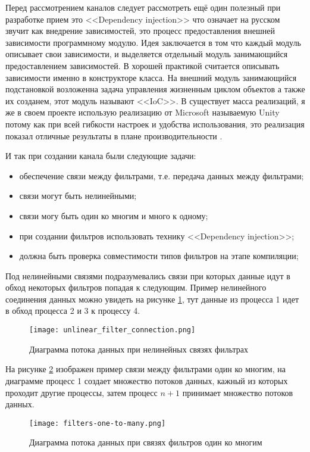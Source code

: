Перед рассмотрением каналов следует рассмотреть ещё один полезный при разработке прием это <<Dependency injection>> что означает на русском звучит как внедрение зависимостей, это процесс предоставления внешней зависимости программному модулю. Идея заключается в том что каждый модуль описывает свои зависимости, и выделяется отдельный модуль занимающийся предоставлением зависимостей. В \csharp{} хорошей практикой считается описывать зависимости именно в конструкторе класса. На внешний модуль занимающийся подстановкой возложенна задача управления жизненным циклом объектов а также их созданем, этот модуль называют <<IoC>>. В \dotnet{} существует масса реализаций, я же в своем проекте использую реализацию от Microsoft называемую Unity потому как при всей гибкости настроек и удобства использования, это реализация показал отличные результаты в плане производительности \cite{ioc_perfomance}.

И так при создании канала были следующие задачи:
\begin{itemize}
  \item обеспечение связи между фильтрами, т.е. передача данных между фильтрами;
  \item связи могут быть нелинейными;
  \item связи могу быть один ко многим и много к одному;
  \item при создании фильтров использовать технику <<Dependency injection>>;
  \item должна быть проверка совместимости типов фильтров на этапе компиляции;
\end{itemize}

Под нелинейными связями подразумевались связи при которых данные идут в обход некоторых фильтров попадая к следующим. Пример нелинейного соединения данных можно увидеть на рисунке \ref{fig:creation:unlinear_filter_connection}, тут данные из процесса 1 идет в обход процесса 2 и 3 к процессу 4.
\begin{figure}[ht] 
    \centering
    \texttt{[image: unlinear\_filter\_connection.png]}  
    \caption{Диаграмма потока данных при нелинейных связях фильтрах}
    \label{fig:creation:unlinear_filter_connection}
\end{figure}

На рисунке \ref{fig:creation:filters-one-to-many} изображен пример связи между фильтрами один ко многим, на диаграмме процесс 1 создает множество потоков данных, кажный из которых проходит другие процессы, затем процесс $n+1$ принимает множество потоков данных.
\begin{figure}[ht] 
    \centering
    \texttt{[image: filters-one-to-many.png]}  
    \caption{Диаграмма потока данных при связях фильтров один ко многим}
    \label{fig:creation:filters-one-to-many}
\end{figure}

